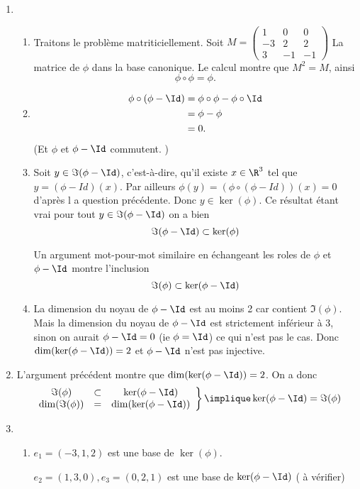 \begin{correction}
\begin{enumerate}
\item 
\begin{enumerate}
\item Traitons le problème matriticiellement. Soit $M= \left( 
\begin{array}{ccc}
1 &0& 0\\
-3 &2& 2\\
3 &-1& -1
\end{array}\right)$
La matrice de $\phi$ dans la base canonique. Le calcul montre que $M^2 = M$, ainsi 
$$\phi \circ \phi = \phi.$$
\item 
\begin{align*}
\phi \circ (\phi - \Id ) &= \phi \circ \phi -\phi \circ \Id\\
								&= \phi  -\phi \\
							&=0.
\end{align*}
(Et  $\phi$  et $\phi-\Id$ commutent. )
\item Soit $y\in \Im(\phi -\Id)$, c'est-à-dire, qu'il existe $x\in \R^3$ tel que $y =(\phi-Id)(x)$. Par ailleurs $\phi(y) = (\phi \circ (\phi-Id))(x) =0$ d'après l	a question précédente. 
Donc $y\in \ker(\phi)$. Ce résultat étant vrai pour tout $y\in \Im(\phi -\Id)$ on a bien 
$$\Im(\phi -\Id) \subset \ker(\phi)$$

Un argument mot-pour-mot similaire en échangeant les roles de $\phi$ et $\phi- \Id$ montre l'inclusion 
$$\Im(\phi) \subset \ker(\phi-\Id)$$
 \item La dimension du noyau de $\phi-\Id$ est au moins 2 car contient $\Im(\phi)$. Mais la dimension du noyau de $\phi-\Id$ est strictement inférieur à 3, sinon on aurait $\phi-\Id = 0 $ (ie $\phi = \Id $) ce qui n'est pas le cas. Donc $\dim(\ker (\phi-\Id)) = 2$ et $\phi-\Id$ n'est pas injective. 
\end{enumerate}
\item L'argument précédent montre que $\dim(\ker (\phi-\Id)) = 2$. On a donc
$$\left.\begin{array}{ccc}
\Im(\phi)&\subset& \ker (\phi-\Id) \\
\dim(\Im(\phi)) &=& \dim(\ker (\phi-\Id)) 
\end{array} \right\} \implique \ker (\phi-\Id) =\Im(\phi)$$

\item \begin{enumerate}
\item $e_1=\left( -3, 1, 2\right)$ est une base de $\ker (\phi)$. 

$e_2= (1,3,0), e_3=(0,2,1)$ est une base de $\ker(\phi-\Id)$ ( à vérifier) 


\end{enumerate}
\end{enumerate}
\end{correction}
